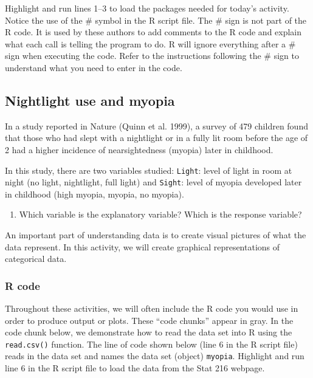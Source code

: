 \documentclass[
]{report}
\providecommand{\tightlist}{%
  \setlength{\itemsep}{0pt}\setlength{\parskip}{0pt}}
\begin{document}
Highlight and run lines 1--3 to load the packages needed for today's activity. Notice the use of the \# symbol in the R script file. The \# sign is not part of the R code. It is used by these authors to add comments to the R code and explain what each call is telling the program to do.
R will ignore everything after a \# sign when executing the code. Refer to the instructions following the \# sign to understand what you need to enter in the code.

\hypertarget{nightlight-use-and-myopia}{%
\subsection*{Nightlight use and myopia}\label{nightlight-use-and-myopia}}

In a study reported in Nature (Quinn et al. 1999), a survey of 479 children found that those who had slept with a nightlight or in a fully lit room before the age of 2 had a higher incidence of nearsightedness (myopia) later in childhood.

In this study, there are two variables studied: \texttt{Light}: level of light in room at night (no light, nightlight, full light) and \texttt{Sight}: level of myopia developed later in childhood (high myopia, myopia, no myopia).

\begin{enumerate}
\def\labelenumi{\arabic{enumi}.}
\tightlist
\item
  Which variable is the explanatory variable? Which is the response variable?
\end{enumerate}

\vspace{0.8in}

An important part of understanding data is to create visual pictures of what the data represent. In this activity, we will create graphical representations of categorical data.

\hypertarget{r-code}{%
\subsubsection*{R code}\label{r-code}}

Throughout these activities, we will often include the R code you would use in order to produce output or plots. These ``code chunks'' appear in gray. In the code chunk below, we demonstrate how to read the data set into R using the \texttt{read.csv()} function. The line of code shown below (line 6 in the R script file) reads in the data set and names the data set (object) \texttt{myopia}. Highlight and run line 6 in the R script file to load the data from the Stat 216 webpage.
\end{document}

